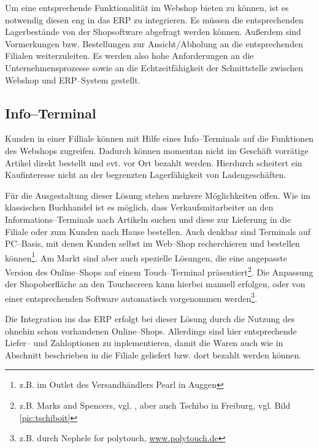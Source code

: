 Um eine entsprechende Funktionalität im Webshop bieten zu können, ist es notwendig diesen eng in das \ac{ERP} zu integrieren. Es müssen die entsprechenden Lagerbestände von der Shopsoftware abgefragt werden können. Außerdem sind Vormerkungen bzw. Bestellungen zur Ansicht/Abholung an die entsprechenden Filialen weiterzuleiten.  Es werden also hohe Anforderungen an die Unternehmensprozesse sowie an die Echtzeitfähigkeit der Schnittstelle zwischen Webshop und ERP--System gestellt.

\subsection{Info--Terminal}

Kunden in einer Filliale können mit Hilfe eines Info–Terminals auf die Funktionen des Webshops zugreifen. Dadurch können momentan nicht im Geschäft vorrätige Artikel direkt bestellt und evt. vor Ort bezahlt werden. Hierdurch scheitert ein Kaufinteresse nicht an der begrenzten Lagerfähigkeit von Ladengeschäften.

Für die Ausgestaltung dieser Lösung stehen mehrere Möglichkeiten offen. Wie im klassischen Buchhandel ist es möglich, dass Verkaufsmitarbeiter an den Informations–Terminals nach Artikeln suchen und diese zur Lieferung in die Filiale oder zum Kunden nach Hause bestellen. Auch denkbar sind Terminals auf PC–Basis, mit denen Kunden selbst im Web–Shop recherchieren und bestellen können\footnote{z.B. im Outlet des Versandhändlers Pearl in Auggen}. Am Markt sind aber auch spezielle Lösungen, die eine angepasste Version des Online–Shops auf einem Touch–Terminal präsentiert\footnote{z.B. Marks and Spencers, vgl. \cite{intelms}, aber auch Tschibo in Freiburg, vgl. Bild \ref{pic:tschiboit}}. Die Anpassung der Shop\-ober\-fläche an den Touchscreen kann hierbei manuell erfolgen, oder von einer entsprechenden Software automatisch vorgenommen werden\footnote{z.B. durch Nephele for polytouch, \url{www.polytouch.de}}.

Die Integration ins das \ac{ERP} erfolgt bei dieser Lösung durch die Nutzung des ohnehin schon vorhandenen Online–Shops. Allerdings sind hier entsprechende Liefer-- und Zahloptionen zu inplementieren, damit die Waren auch wie in Abschnitt  beschrieben in die Filiale geliefert bzw. dort bezahlt werden können. 

